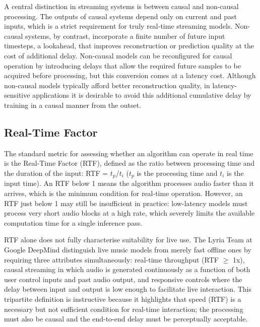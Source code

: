 A central distinction in streaming systems is between causal and non-causal processing. The outputs of causal systems depend only on current and past inputs, which is a strict requirement for truly real-time streaming models. Non-causal systems, by contrast, incorporate a finite number of future input timesteps, a lookahead, that improves reconstruction or prediction quality at the cost of additional delay. Non-causal models can be reconfigured for causal operation by introducing delays that allow the required future samples to be acquired before processing, but this conversion comes at a latency cost. Although non-causal models typically afford better reconstruction quality, in latency-sensitive applications it is desirable to avoid this additional cumulative delay by training in a causal manner from the outset.\cite{caspe2025designing} 

\subsection{Real-Time Factor}

The standard metric for assessing whether an algorithm can operate in real time is the Real-Time Factor (RTF), defined as the ratio between processing time and the duration of the input: RTF = ${t_p}$/${t_i}$ (${t_p}$ is the processing time and ${t_i}$ is the input time).\cite{caspe2025designing}  An RTF below 1 means the algorithm processes audio faster than it arrives, which is the minimum condition for real-time operation. However, an RTF just below 1 may still be insufficient in practice: low-latency models must process very short audio blocks at a high rate, which severely limits the available computation time for a single inference pass.\cite{caspe2025designing} 

RTF alone does not fully characterise suitability for live use. The Lyria Team at Google DeepMind distinguish live music models from merely fast offline ones by requiring three attributes simultaneously: real-time throughput (RTF $\geq$ 1x), causal streaming in which audio is generated continuously as a function of both user control inputs and past audio output, and responsive controls where the delay between input and output is low enough to facilitate live interaction.\cite{lyriateam2025live}  This tripartite definition is instructive because it highlights that speed (RTF) is a necessary but not sufficient condition for real-time interaction; the processing must also be causal and the end-to-end delay must be perceptually acceptable.

